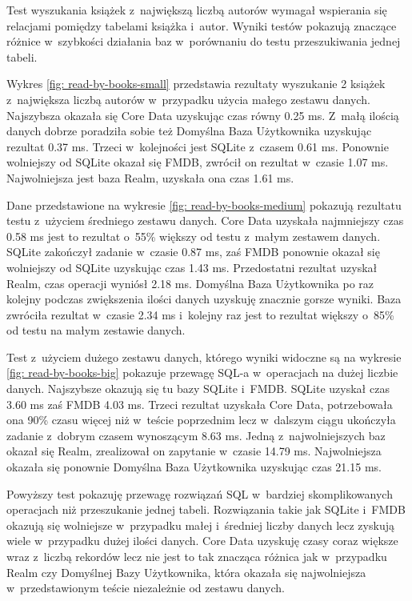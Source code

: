Test wyszukania książek z~największą liczbą autorów wymagał wspierania się relacjami pomiędzy tabelami książka i~autor. Wyniki testów pokazują znaczące różnice w~szybkości działania baz w~porównaniu do testu przeszukiwania jednej tabeli. 

Wykres \ref{fig: read-by-books-small} przedstawia rezultaty wyszukanie 2 książek z~największa liczbą autorów w~przypadku użycia małego zestawu danych. Najszybsza okazała się Core Data uzyskując czas równy 0.25 ms. Z~małą ilością danych dobrze poradziła sobie też Domyślna Baza Użytkownika uzyskując rezultat 0.37 ms. Trzeci w~kolejności jest SQLite z~czasem 0.61 ms. Ponownie wolniejszy od SQLite okazał się FMDB, zwrócił on rezultat w~czasie 1.07 ms. Najwolniejsza jest baza Realm, uzyskała ona czas 1.61 ms.

Dane przedstawione na wykresie \ref{fig: read-by-books-medium} pokazują rezultatu testu z~użyciem średniego zestawu danych. Core Data uzyskała najmniejszy czas 0.58 ms jest to rezultat o~55\% większy od testu z~małym zestawem danych. SQLite zakończył zadanie w~czasie 0.87 ms, zaś FMDB ponownie okazał się wolniejszy od SQLite uzyskując czas 1.43 ms. Przedostatni rezultat uzyskał Realm, czas operacji wyniósł 2.18 ms. Domyślna Baza Użytkownika po raz kolejny podczas zwiększenia ilości danych uzyskuję znacznie gorsze wyniki. Baza zwróciła rezultat w~czasie 2.34 ms i~kolejny raz jest to rezultat większy o~85\% od testu na małym zestawie danych. 

Test z~użyciem dużego zestawu danych, którego wyniki widoczne są na wykresie \ref{fig: read-by-books-big} pokazuje przewagę SQL-a w~operacjach na dużej liczbie danych. Najszybsze okazują się tu bazy SQLite i~FMDB. SQLite uzyskał czas 3.60 ms zaś FMDB 4.03 ms. Trzeci rezultat uzyskała Core Data, potrzebowała ona 90\% czasu więcej niż w~teście poprzednim lecz w~dalszym ciągu ukończyła zadanie z~dobrym czasem wynoszącym 8.63 ms. Jedną z~najwolniejszych baz okazał się Realm, zrealizował on zapytanie w~czasie 14.79 ms. Najwolniejsza okazała się ponownie Domyślna Baza Użytkownika uzyskując czas 21.15 ms. 

Powyższy test pokazuję przewagę rozwiązań SQL w~bardziej skomplikowanych operacjach niż przeszukanie jednej tabeli. Rozwiązania takie jak SQLite i~FMDB okazują się wolniejsze w~przypadku małej i~średniej liczby danych lecz zyskują wiele w~przypadku dużej ilości danych. Core Data uzyskuję czasy coraz większe wraz z~liczbą rekordów lecz nie jest to tak znacząca różnica jak w~przypadku Realm czy Domyślnej Bazy Użytkownika, która okazała się najwolniejsza w~przedstawionym teście niezależnie od zestawu danych. 

